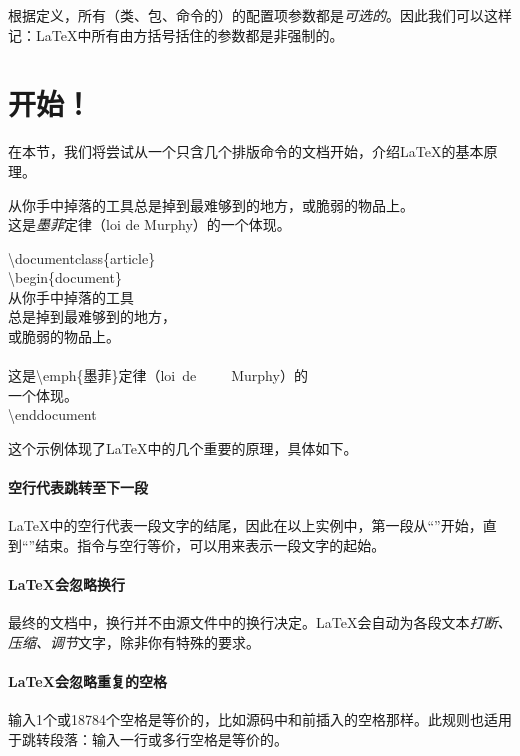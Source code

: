 \begin{exclamation}
    根据定义，所有（类、包、命令的）的配置项参数都是\textit{可选的}。因此我们可以这样记：\LaTeX 中所有由方括号括住的参数\dm{[...]}都是非强制的。
\end{exclamation}

\section{开始！}

在本节，我们将尝试从一个只含几个排版命令的文档开始，介绍\LaTeX 的基本原理。

\begin{codelist}[1.1]{
    从你手中掉落的工具总是掉到最难够到的地方，或脆弱的物品上。\\
    这是\emph{墨菲}定律（loi de Murphy）的一个体现。
}  \begin{dmd}
    \backslash documentclass\{article\}\\
    \backslash begin\{document\}\\
    从你手中掉落的工具\\总是掉到最难够到的地方，\\或脆弱的物品上。\\
    ~\\
    这是\backslash emph\{墨菲\}定律（loi\ de\ \ \ \ \  Murphy）的\\一个体现。\\
    \backslash end{document}
\end{dmd}
\end{codelist}

这个示例体现了\LaTeX 中的几个重要的原理，具体如下。

\paragraph*{空行代表跳转至下一段} \LaTeX 中的空行代表一段文字的结尾，因此在以上实例中，第一段从“”开始，直到“”结束。指令与空行等价，可以用来表示一段文字的起始。

\paragraph*{\LaTeX 会忽略换行}最终的文档中，换行并不由源文件中的换行决定。\LaTeX 会自动为各段文本\textit{打断、压缩、调节}文字，除非你有特殊的要求。

\paragraph*{\LaTeX 会忽略重复的空格}输入1个或18784个空格是等价的，比如源码中和前插入的空格那样。此规则也适用于跳转段落：输入一行或多行空格是等价的。

